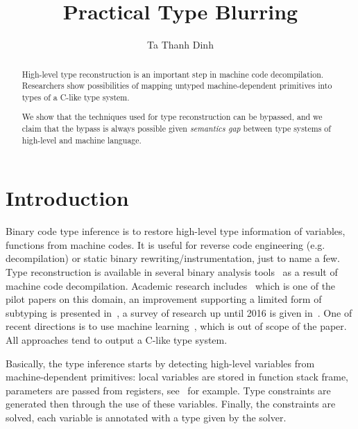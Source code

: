 \documentclass[a4paper]{llncs}
\begin{document}
%
\title{Practical Type Blurring}
%
%
\author{Ta Thanh Dinh}
%
%
%
\maketitle              %
%
\begin{abstract}
High-level type reconstruction is an important step in machine code decompilation.
Researchers show possibilities of mapping untyped machine-dependent
primitives into types of a C-like type system.


We show that the techniques used for type reconstruction can be bypassed,
and we claim that the bypass is always possible given \emph{semantics gap} between
type systems of high-level and machine language.
\end{abstract}
%
%
%
\section{Introduction}
Binary code type inference is to restore high-level type information of variables,
functions from machine codes. It is useful for reverse code engineering (e.g.
decompilation) or static binary rewriting/instrumentation, just to name a few.
Type reconstruction is available in several binary analysis
tools~\cite{noauthor_hex-rays_nodate, noauthor_jeb_nodate, noauthor_ghidra_nodate}
as a result of machine code decompilation. Academic research includes~\cite{mycroft_type-based_1999}
which is one of the pilot papers on this domain, an improvement supporting
a limited form of subtyping is presented in~\cite{lee_tie_2011}, a survey of
research up until 2016 is given in~\cite{caballero_type_2016}. One of recent
directions is to use machine learning~\cite{maier_typeminer_2019}, which is out of scope of
the paper. All approaches tend to output a C-like type system.

Basically, the type inference starts by detecting high-level variables from
machine-dependent primitives: local variables are stored in function stack frame,
parameters are passed from registers, see~\cite{balakrishnan_wysinwyx_2007} for example.
Type constraints are generated then through the use of these variables. Finally,
the constraints are solved, each variable is annotated with a type given by the solver.
\end{document}

